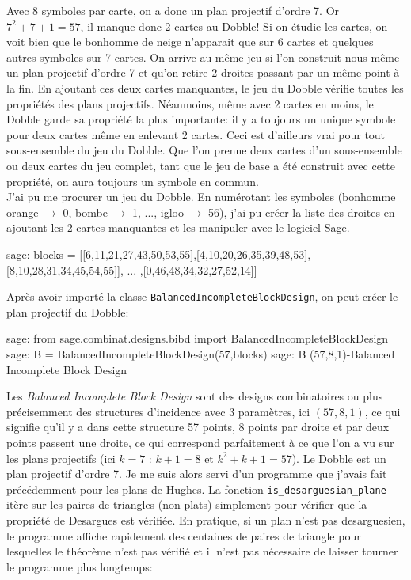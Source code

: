 \documentclass[a4paper]{article}
\begin{document}
Avec 8 symboles par carte, on a donc un plan projectif d'ordre 7. Or $7^2+7+1=57$, il manque donc 2 cartes au Dobble! Si on étudie les cartes, on voit bien que le bonhomme de neige n'apparait que sur 6 cartes et quelques autres symboles sur 7 cartes. On arrive au même jeu si l'on construit nous même un plan projectif d'ordre 7 et qu'on retire 2 droites passant par un même point à la fin.
En ajoutant ces deux cartes manquantes, le jeu du Dobble vérifie toutes les propriétés des plans projectifs. Néanmoins, même avec 2 cartes en moins, le Dobble garde sa propriété la plus importante: il y a toujours un unique symbole pour deux cartes même en enlevant 2 cartes. Ceci est d'ailleurs vrai pour tout sous-ensemble du jeu du Dobble. Que l'on prenne deux cartes d'un sous-ensemble ou deux cartes du jeu complet, tant que le jeu de base a été construit avec cette propriété, on aura toujours un symbole en commun.\vspace{1\baselineskip}\\
J'ai pu me procurer un jeu du Dobble. En numérotant les symboles (bonhomme orange $\rightarrow$ 0, bombe $\rightarrow$ 1, ..., igloo $\rightarrow$ 56), j'ai pu créer la liste des droites en ajoutant les 2 cartes manquantes et les manipuler avec le logiciel Sage.
\begin{sageverbatim}
 sage: blocks = [[6,11,21,27,43,50,53,55],[4,10,20,26,35,39,48,53],
        [8,10,28,31,34,45,54,55]], ... ,[0,46,48,34,32,27,52,14]]
\end{sageverbatim}
Après avoir importé la classe \texttt{BalancedIncompleteBlockDesign}, on peut créer le plan projectif du Dobble:
\begin{sageverbatim}
 sage: from sage.combinat.designs.bibd import BalancedIncompleteBlockDesign
 sage: B = BalancedIncompleteBlockDesign(57,blocks)
 sage: B
 (57,8,1)-Balanced Incomplete Block Design
\end{sageverbatim}
Les \textit{Balanced Incomplete Block Design} sont des designs combinatoires ou plus précisemment des structures d'incidence avec 3 paramètres, ici $(57, 8, 1)$, ce qui signifie qu'il y a dans cette structure 57 points, 8 points par droite et par deux points passent une droite, ce qui correspond parfaitement à ce que l'on a vu sur les plans projectifs (ici $k=7$ : $k+1=8$ et $k^2+k+1=57$).
Le Dobble est un plan projectif d'ordre 7.
\newpage
Je me suis alors servi d'un programme que j'avais fait précédemment pour les plans de Hughes. La fonction \texttt{is\_desarguesian\_plane} itère sur les paires de triangles (non-plats) simplement pour vérifier que la propriété de Desargues est vérifiée. En pratique, si un plan n'est pas desarguesien, le programme affiche rapidement des centaines de paires de triangle pour lesquelles le théorème n'est pas vérifié et il n'est pas nécessaire de laisser tourner le programme plus longtemps:
\end{document}
